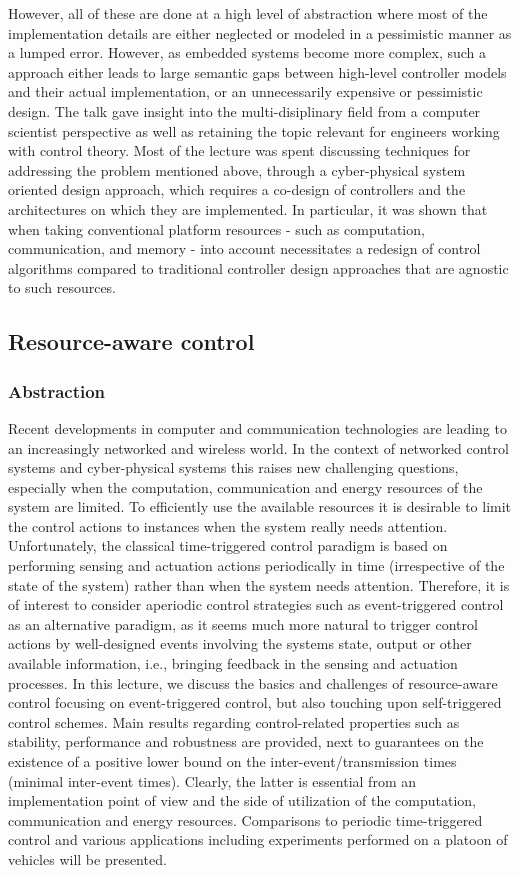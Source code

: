 \documentclass[9pt, english, a4paper]{article}
\theoremstyle{definition}
\begin{document}
	However, all of these are done at a high level of abstraction where most of the implementation details are either neglected or modeled in a pessimistic manner as a lumped error. However, as embedded systems become more complex, such a approach either leads to large semantic gaps between high-level controller models and their actual implementation, or an unnecessarily expensive or pessimistic design. The talk gave insight into the multi-disiplinary field from a computer scientist perspective as well as retaining the topic relevant for engineers working with control theory. Most of the lecture was spent discussing techniques for addressing the problem mentioned above, through a cyber-physical system oriented design approach, which requires a co-design of controllers and the architectures on which they are implemented. In particular, it was shown that when taking conventional platform resources - such as computation, communication, and memory - into account necessitates a redesign of control algorithms compared to traditional controller design approaches that are agnostic to such resources.

\subsection{Resource-aware control}
	\subsubsection{Abstraction}
		Recent developments in computer and communication technologies are leading to an increasingly networked and wireless world. In the context of networked control systems and cyber-physical systems this raises new challenging questions, especially when the computation, communication and energy resources of the system are limited. To efficiently use the available resources it is desirable to limit the control actions to instances when the system really needs attention. Unfortunately, the classical time-triggered control paradigm is based on performing sensing and actuation actions periodically in time (irrespective of the state of the system) rather than when the system needs attention. Therefore, it is of interest to consider aperiodic control strategies such as event-triggered control as an alternative paradigm, as it seems much more natural to trigger control actions by well-designed events involving the systems state, output or other available information, i.e., bringing feedback in the sensing and actuation processes. In this lecture, we discuss the basics and challenges of resource-aware control focusing on  event-triggered control, but also touching upon self-triggered control schemes. Main results regarding control-related properties such as stability, performance and robustness are provided, next to guarantees on the existence of a positive lower bound on the inter-event/transmission times (minimal inter-event times).  Clearly, the latter is essential from an implementation point of view and the side of utilization of the computation, communication and energy resources. Comparisons to periodic time-triggered control and various applications including experiments performed on a platoon of vehicles will be presented.
\end{document}
